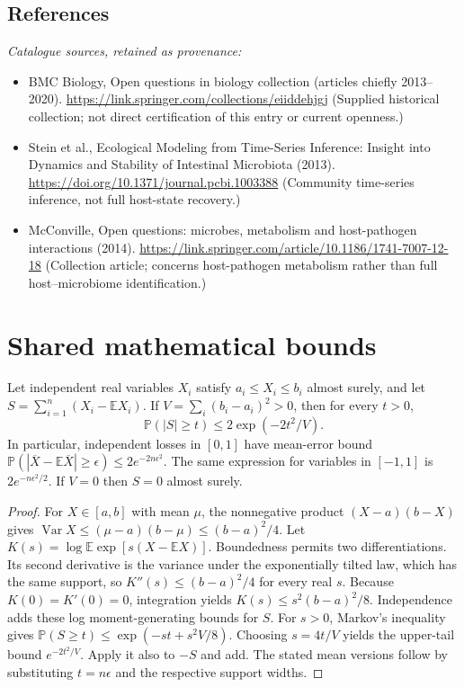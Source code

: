 \documentclass[11pt]{article}
\begin{document}
\subsection{References}
\noindent\emph{Catalogue sources, retained as provenance:}
\begin{itemize}
\item BMC Biology, Open questions in biology collection (articles chiefly 2013--2020). \url{https://link.springer.com/collections/eiiddehjgj} (Supplied historical collection; not direct certification of this entry or current openness.)
\item Stein et al., Ecological Modeling from Time-Series Inference: Insight into Dynamics and Stability of Intestinal Microbiota (2013). \url{https://doi.org/10.1371/journal.pcbi.1003388} (Community time-series inference, not full host-state recovery.)
\item McConville, Open questions: microbes, metabolism and host-pathogen interactions (2014). \url{https://link.springer.com/article/10.1186/1741-7007-12-18} (Collection article; concerns host-pathogen metabolism rather than full host--microbiome identification.)
\end{itemize}




\section{Shared mathematical bounds}\label{app:bounds}
\begin{lemma}\label{lem:bounded}
Let independent real variables $X_i$ satisfy $a_i\leq X_i\leq b_i$ almost surely,
and let $S=\sum_{i=1}^n(X_i-\mathbb{E} X_i)$. If
$V=\sum_i(b_i-a_i)^2>0$, then for every $t>0$,
\[
 \mathbb{P}(|S|\geq t)\leq 2\exp(-2t^2/V).
\]
In particular, independent losses in $[0,1]$ have mean-error bound
$\mathbb{P}(|\overline X-\mathbb{E}\overline X|\geq\epsilon)
\leq2e^{-2n\epsilon^2}$. The same expression for variables in $[-1,1]$
is $2e^{-n\epsilon^2/2}$. If $V=0$ then $S=0$ almost surely.
\end{lemma}
\begin{proof}
For $X\in[a,b]$ with mean $\mu$, the nonnegative product
$(X-a)(b-X)$ gives
$\operatorname{Var} X\leq(\mu-a)(b-\mu)\leq(b-a)^2/4$.
Let $K(s)=\log\mathbb{E}\exp[s(X-\mathbb{E} X)]$.
Boundedness permits two differentiations. Its second derivative is the variance
under the exponentially tilted law, which has the same support, so
$K''(s)\leq(b-a)^2/4$ for every real $s$.
Because $K(0)=K'(0)=0$, integration yields
$K(s)\leq s^2(b-a)^2/8$.
Independence adds these log moment-generating bounds for $S$.
For $s>0$, Markov's inequality gives
$\mathbb{P}(S\geq t)\leq\exp(-st+s^2V/8)$.
Choosing $s=4t/V$ yields the upper-tail bound $e^{-2t^2/V}$.
Apply it also to $-S$ and add. The stated mean versions follow by substituting
$t=n\epsilon$ and the respective support widths.
\end{proof}
\end{document}
